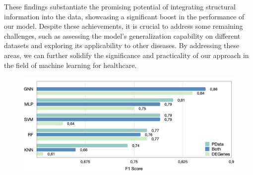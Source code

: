 \documentclass{article}
\begin{document}
\begin{multicols}{2}
These findings substantiate the promising potential of integrating structural information into the data, showcasing a significant boost in the performance of our model. Despite these achievements, it is crucial to address some remaining challenges, such as assessing the model's generalization capability on different datasets and exploring its applicability to other diseases. By addressing these areas, we can further solidify the significance and practicality of our approach in the field of machine learning for healthcare.

\end{multicols}

\begin{figure}[!t]
    \centering
    \includegraphics[width=\linewidth]{assets/compare3.png} 
    \label{fig:compare}
\end{figure}
\end{document}
